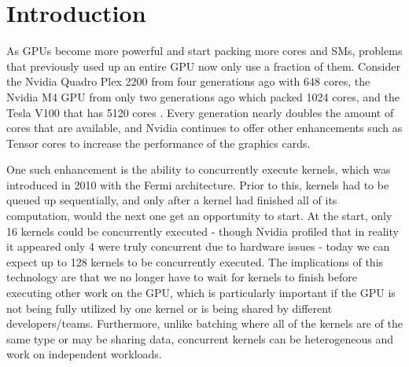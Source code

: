 \documentclass[sigconf]{acmart}
\begin{document}



\maketitle

\section{Introduction}
As GPUs become more powerful and start packing more cores and SMs, problems that previously used up an entire GPU now only use a fraction of them. Consider the Nvidia Quadro Plex 2200 from four generations ago with 648 cores, the Nvidia M4 GPU from only two generations ago which packed 1024 cores, and the Tesla V100 that has 5120 cores \cite{nvidia_all_gpus}. Every generation nearly doubles the amount of cores that are available, and Nvidia continues to offer other enhancements such as Tensor cores to increase the performance of the graphics cards. 

One such enhancement is the ability to concurrently execute kernels, which was introduced in 2010 with the Fermi architecture. Prior to this, kernels had to be queued up sequentially, and only after a kernel had finished all of its computation, would the next one get an opportunity to start. At the start, only 16 kernels could be concurrently executed - though Nvidia profiled that in reality it appeared only 4 were truly concurrent due to hardware issues - today we can expect up to 128 kernels to be concurrently executed. The implications of this technology are that we no longer have to wait for kernels to finish before executing other work on the GPU, which is particularly important if the GPU is not being fully utilized by one kernel or is being shared by different developers/teams. Furthermore, unlike batching where all of the kernels are of the same type or may be sharing data, concurrent kernels can be heterogeneous and work on independent workloads. 
\end{document}
